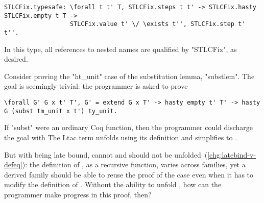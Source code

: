 \begin{centered}
\begin{minipage}{.880\textwidth}
\begin{lstlisting}[basicstyle=\fontsize{8.25}{9}\ttfamily]
STLCFix.typesafe: \forall t t' T, STLCFix.steps t t' -> STLCFix.hasty STLCFix.empty t T ->
                  STLCFix.value t' \/ \exists t'', STLCFix.step t' t''.
\end{lstlisting}
\end{minipage}
\end{centered}

\noindent
In this type, all references to nested names are qualified by "STLCFix", as desired.



Consider proving the "ht_unit" case of the substitution lemma, "substlem".
The goal is seemingly trivial: the programmer is asked to prove

\begin{centered}
\begin{minipage}{\textwidth}
\begin{lstlisting}[basicstyle=\fontsize{8.25}{9}\ttfamily]
\forall G' G x t' T', G' = extend G x T' -> hasty empty t' T' -> hasty G (subst tm_unit x t') ty_unit.
\end{lstlisting}
\end{minipage}
\end{centered}

\noindent
If "subst" were an ordinary Coq function, then the programmer could
discharge the goal with
The Ltac term  unfolds  using its definition
and simplifies  to .

But with  being late bound,  cannot and should not
be unfolded~(\ref{chg:latebind-v-defeq}):
the definition of , as a recursive function,
varies across families, yet a derived family should be able to reuse the
proof of the  case
even when it has to modify the definition of .
Without the ability to unfold ,
how can the programmer make progress in this proof, then?

